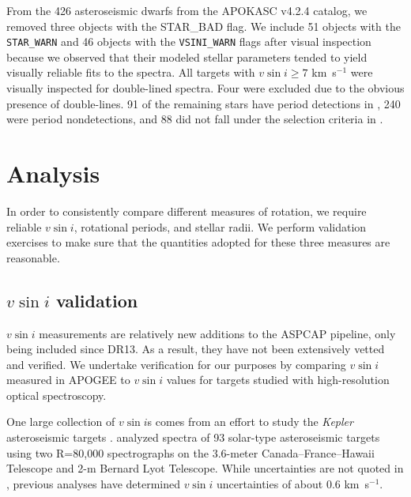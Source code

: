 \documentclass[manuscript]{aastex6}
\newcommand{\vsini}{\ensuremath{v \sin i}}
\newcommand{\Kepler}{\mbox{\textit{Kepler}}}
\newcommand{\kms}{\textrm{ km~s}\ensuremath{^{-1}}}
\newcommand{\STARWARN}{\texttt{STAR\_WARN}}
\newcommand{\VSINIWARN}{\texttt{VSINI\_WARN}}
\begin{document}
From the 426 asteroseismic dwarfs from the APOKASC v4.2.4 catalog, we removed 
three objects with the STAR\_BAD flag. We include 51 objects with 
the \STARWARN{} and 46 objects with the \VSINIWARN{} flags after visual 
inspection because we observed that their modeled stellar parameters tended to
yield visually reliable fits to the spectra.  All targets with \(\vsini \ge
7\) \kms{} were visually
inspected for double-lined spectra. Four were excluded due to the obvious
presence of double-lines. 91 of the remaining stars have period detections in 
\citet{McQuillan14}, 240 were period nondetections, and 88 did not fall under 
the selection criteria in \citet{McQuillan14}. 

\section{Analysis}
\label{sec:analysis}

In order to consistently compare different measures of rotation, we require 
reliable \vsini{}, rotational periods, and stellar radii. We perform validation
exercises to make sure that the quantities adopted for these three measures are 
reasonable.


\subsection{\vsini{} validation}
\label{sec:vsini_check}

\vsini{} measurements are relatively new additions to the ASPCAP pipeline, only
being included since DR13. As a result, they have not been extensively vetted and 
verified. We undertake verification for our purposes by comparing \vsini{} 
measured in APOGEE to \vsini{} values for
targets studied with high-resolution optical spectroscopy. 

One large collection of \vsini{}s comes from an effort to study the
\Kepler{} asteroseismic targets \citep{Bruntt12}. \citet{Bruntt12} analyzed 
spectra of 93 solar-type asteroseismic targets using two R=80,000 spectrographs 
on the 3.6-meter Canada--France--Hawaii Telescope and 2-m Bernard Lyot
Telescope. While uncertainties are not quoted in \citet{Bruntt12},
previous analyses have determined \vsini{} uncertainties of about 0.6
\kms \citep{Bruntt10a,Bruntt10b}.
\end{document}
